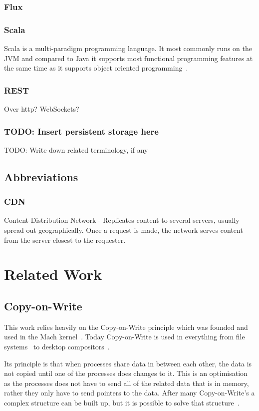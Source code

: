 \documentclass[a4paper,12pt]{article}
\begin{document}
\subsubsection{Flux}


\subsubsection{Scala}
Scala is a multi-paradigm programming language. It most commonly runs on the JVM and compared to Java it supports 
most functional programming features at the same time as it supports object oriented programming~\cite{SCALA}.

\subsubsection{REST}
Over http? WebSockets? 
\subsubsection{TODO: Insert persistent storage here}
    TODO: Write down related terminology, if any
\subsection{Abbreviations}

\subsubsection{CDN}
Content Distribution Network - Replicates content to several servers, usually spread out geographically. Once a 
request is made, the network serves content from the server closest to the requester.

\section{Related Work}
\subsection{Copy-on-Write}
This work relies heavily on the Copy-on-Write principle which was founded and used in the Mach kernel~\cite{COPYONWRITE}. 
Today Copy-on-Write is used in everything from file systems~\cite{BTRFS} to desktop compositors~\cite{COMPOSITOR}.

Its principle is that when processes share data in between each other, the data is not copied until one of the processes 
does changes to it. This is an optimisation as the processes does not have to send all of the related data that is in memory, 
rather they only have to send pointers to the data. After many Copy-on-Write's a complex structure can be built up, 
but it is possible to solve that structure~\cite{COPYONWRITE2}.
\end{document}
